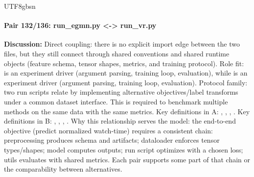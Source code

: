 \documentclass[11pt]{article}
\begin{document}
\begin{CJK*}{UTF8}{gbsn}
\paragraph{Pair 132/136: run\_egmn.py <-> run\_vr.py}
\textbf{Discussion:} Direct coupling: there is no explicit import edge between the two files, but they still connect through shared conventions and shared runtime objects (feature schema, tensor shapes, metrics, and training protocol). Role fit: \texttt{} is an experiment driver (argument parsing, training loop, evaluation), while \texttt{} is an experiment driver (argument parsing, training loop, evaluation). Protocol family: two run scripts relate by implementing alternative objectives/label transforms under a common dataset interface. This is required to benchmark multiple methods on the same data with the same metrics. Key definitions in A: \texttt{}, \texttt{}, \texttt{}, \texttt{}. Key definitions in B: \texttt{}, \texttt{}, \texttt{}, \texttt{}. Why this relationship serves the model: the end-to-end objective (predict normalized watch-time) requires a consistent chain: preprocessing produces schema and artifacts; dataloader enforces tensor types/shapes; model computes outputs; run script optimizes with a chosen loss; utils evaluates with shared metrics. Each pair supports some part of that chain or the comparability between alternatives.


\end{CJK*}
\end{document}
